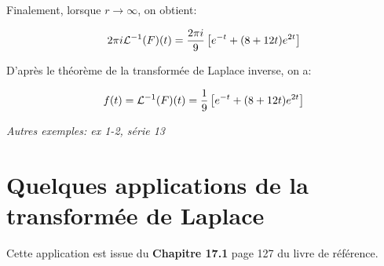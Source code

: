 \begin{example}[3]
Finalement, lorsque $r \rightarrow \infty$, on obtient:

\[
    2 \pi i \mathcal{L}^{-1}(F)(t) = \frac{2 \pi i}{9} \left[ e^{-t} + (8 + 12t) e^{2t} \right]
\]

D'après le théorème de la transformée de Laplace inverse, on a:

\[
    f(t) = \mathcal{L}^{-1}(F)(t)
    = \frac{1}{9} \left[ e^{-t} + (8 + 12t) e^{2t} \right]
\]
\end{example}

\textit{Autres exemples: ex 1-2, série 13}


\section{Quelques applications de la transformée de Laplace}

\begin{note}
    Cette application est issue du \textbf{Chapitre 17.1} page 127 du livre de référence.
\end{note}

